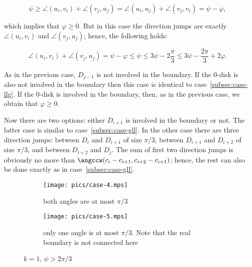 \begin{enumerate}[label={\bf Case \arabic*: }, wide, labelwidth=!, labelindent=0pt]
$$\psi\geq\angle(u_i, v_i) + \angle(v_j, u_j) = \angle(u_i, u_j) + \angle(v_j, v_i) = \psi - \varphi,$$

which implies that $\varphi\geq 0$. But in this case the direction jumps are exactly $\angle(u_i, v_i)$ and $\angle(v_j, u_j)$; hence, the following holds:

$$\angle(u_i, v_i) + \angle(v_j, u_j) = \psi - \varphi \leq \psi \leq 3\psi - 2\frac{\pi}{3} \leq 3\psi - \frac{2\pi}{3} + 2\varphi.$$



As in the previous case, $D_{j-1}$ is not involved in the boundary. If the $0$-disk is also not involved in the boundary then this case is identical to case~\ref{subsec:case-llg}. If the $0$-disk is involved in the boundary, then, as in the previous case, we obtain that $\varphi\geq 0$.

Now there are two options: either $D_{i+1}$ is involved in the boundary or not. The latter case is similar to case~\ref{subsec:case-gll}. In the other case there are three direction jumps: between $D_i$ and $D_{i+1}$ of size $\pi/3$, between $D_{i+1}$ and $D_{i+2}$ of size $\pi/3$, and between $D_{i+2}$ and $D_j$. The sum of first two direction jumps is obviously no more than $\angccw(c_i - c_{i+1}, c_{i+2} - c_{i+1})$; hence, the rest can also be done exactly as in case~\ref{subsec:case-gll}.

\begin{figure}[h!]
    \centering
    \begin{subfigure}{.45\textwidth}
    \texttt{[image: pics/case-4.mps]}
    \caption{both angles are at most $\pi/3$}
    \end{subfigure}
    \begin{subfigure}{.45\textwidth}
    \texttt{[image: pics/case-5.mps]}
    \caption{only one angle is at most $\pi/3$. Note that the real boundary is not connected here}
    \end{subfigure}
    \caption{$k = 1$, $\psi > 2\pi/3$}
\end{figure}



\end{enumerate}
